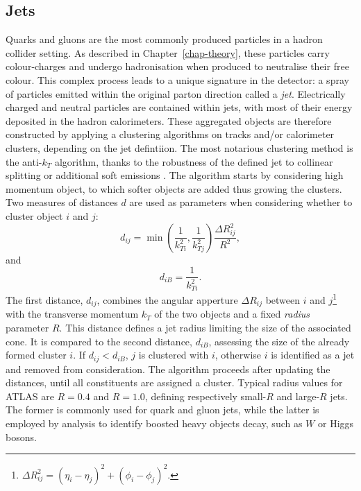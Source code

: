 \subsection{Jets}
Quarks and gluons are the most commonly produced particles in a hadron collider setting. As described in Chapter~\ref{chap-theory}, these particles carry colour-charges and undergo hadronisation when produced to neutralise their free colour. This complex process leads to a unique signature in the detector: a spray of particles emitted within the original parton direction called a \textit{jet}. Electrically charged and neutral particles are contained within jets, with most of their energy deposited in the hadron calorimeters. These aggregated objects are therefore constructed by applying a clustering algorithms on tracks and/or calorimeter clusters, depending on the jet defintiion. The most notarious clustering method is the anti-$k_T$ algorithm, thanks to the robustness of the defined jet to collinear splitting or additional soft emissions \cite{Cacciari:2008gp}. The algorithm starts by considering high momentum object, to which softer objects are added thus growing the clusters. Two measures of distances $d$ are used as parameters when considering whether to cluster object $i$ and $j$:
\begin{equation}
  d_{ij} = \min\left(\frac{1}{k_{Ti}^2}, \frac{1}{k_{Tj}^2} \right) \frac{\Delta R_{ij}^2}{R^2},
\end{equation}
and
\begin{equation}
  d_{iB} = \frac{1}{k_{Ti}^2}.
\end{equation}
The first distance, $d_{ij}$, combines the angular apperture $\Delta R_{ij}$ between $i$ and $j$\footnote{$\Delta R_{ij}^2 = (\eta_i - \eta_j)^2 + (\phi_i - \phi_j)^2$.} with the transverse momentum $k_T$ of the two objects and a fixed \textit{radius} parameter $R$. This distance defines a jet radius limiting the size of the associated cone. It is compared to the second distance, $d_{iB}$, assessing the size of the already formed cluster $i$. If $d_{ij} < d_{iB}$, $j$ is clustered with $i$, otherwise $i$ is identified as a jet and removed from consideration. The algorithm proceeds after updating the distances, until all constituents are assigned a cluster. Typical radius values for ATLAS are $R = 0.4$ and $R=1.0$, defining respectively small-$R$ and large-$R$ jets. The former is commonly used for quark and gluon jets, while the latter is employed by analysis to identify boosted heavy objects decay, such as $W$ or Higgs bosons. \\

